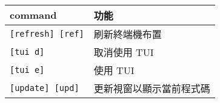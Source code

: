 \begin{center}
     \\
    \begin{tabular}{|p{2.7cm}|p{2.7cm}|}
        \hline
        command                         & 功能 \\
        \hline
        \verb|[refresh] [ref]|          & 刷新終端機布置 \\
        \verb|[tui d]|                  & 取消使用 TUI \\
        \verb|[tui e]|                  & 使用 TUI \\
        \verb|[update] [upd]|           & 更新視窗以顯示當前程式碼 \\
        \hline
    \end{tabular}
\end{center}